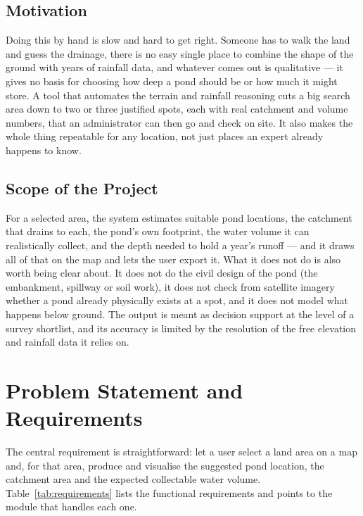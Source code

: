 \documentclass[manuscript,screen]{acmart}
\begin{document}
\subsection{Motivation}
Doing this by hand is slow and hard to get right. Someone has to walk the land and
guess the drainage, there is no easy single place to combine the shape of the
ground with years of rainfall data, and whatever comes out is qualitative --- it
gives no basis for choosing how deep a pond should be or how much it might store.
A tool that automates the terrain and rainfall reasoning cuts a big search area
down to two or three justified spots, each with real catchment and volume numbers,
that an administrator can then go and check on site. It also makes the whole thing
repeatable for any location, not just places an expert already happens to know.

\subsection{Scope of the Project}
For a selected area, the system estimates suitable pond locations, the catchment
that drains to each, the pond's own footprint, the water volume it can realistically
collect, and the depth needed to hold a year's runoff --- and it draws all of that
on the map and lets the user export it. What it does not do is also worth being
clear about. It does not do the civil design of the pond (the embankment, spillway
or soil work), it does not check from satellite imagery whether a pond already
physically exists at a spot, and it does not model what happens below ground. The
output is meant as decision support at the level of a survey shortlist, and its
accuracy is limited by the resolution of the free elevation and rainfall data it
relies on.

\section{Problem Statement and Requirements}
\label{sec:requirements}
The central requirement is straightforward: let a user select a land area on a map
and, for that area, produce and visualise the suggested pond location, the
catchment area and the expected collectable water volume.
Table~\ref{tab:requirements} lists the functional requirements and points to the
module that handles each one.
\end{document}

